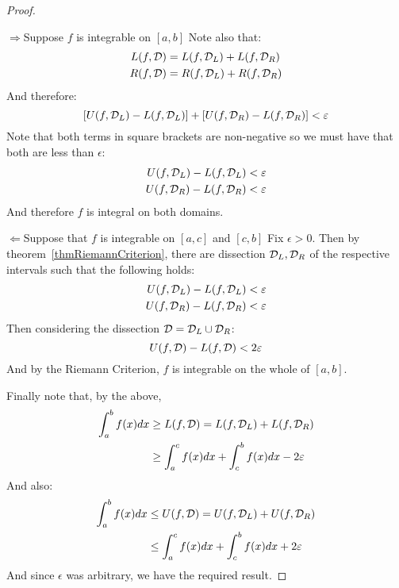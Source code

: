 \documentclass[../Main.tex]{subfiles}
\begin{document}
\begin{proof}
\begin{proofdirection}{$\Rightarrow$}{Suppose $f$ is integrable on $[a, b]$}
        Note also that:
        \begin{align*}
            L(f, \mathcal{D}) &= L(f, \mathcal{D}_L) + L(f, \mathcal{D}_R) \\
            R(f, \mathcal{D}) &= R(f, \mathcal{D}_L) + R(f, \mathcal{D}_R)
        \end{align*}
        And therefore:
        \begin{equation*}
            \left[U(f, \mathcal{D}_L) - L(f, \mathcal{D}_L)\right] + \left[U(f, \mathcal{D}_R) - L(f, \mathcal{D}_R)\right] < \varepsilon
        \end{equation*}
        Note that both terms in square brackets are non-negative so we must have that both are less than $\epsilon$:
        \begin{align*}
            U(f, \mathcal{D}_L) - L(f, \mathcal{D}_L) &< \varepsilon \\
            U(f, \mathcal{D}_R) - L(f, \mathcal{D}_R) &< \varepsilon
        \end{align*}
        And therefore $f$ is integral on both domains.
    \end{proofdirection}
    \begin{proofdirection}{$\Leftarrow$}{Suppose that $f$ is integrable on $[a, c]$ and $[c, b]$}
        Fix $\epsilon > 0$. Then by theorem~\ref{thmRiemannCriterion}, there are dissection $\mathcal{D}_L, \mathcal{D}_R$ of the respective intervals such that the following holds:
        \begin{align*}
            U(f, \mathcal{D}_L) - L(f, \mathcal{D}_L) &< \varepsilon \\
            U(f, \mathcal{D}_R) - L(f, \mathcal{D}_R) &< \varepsilon
        \end{align*}
        Then considering the dissection $\mathcal{D} = \mathcal{D}_L \cup \mathcal{D}_R$:
        \begin{equation*}
            U(f, \mathcal{D}) - L(f, \mathcal{D}) < 2\varepsilon
        \end{equation*}
        And by the Riemann Criterion, $f$ is integrable on the whole of $[a, b]$.
    \end{proofdirection}
    Finally note that, by the above,
    \begin{align*}
        \int_a^b f(x) dx &\geq L(f, \mathcal{D}) = L(f, \mathcal{D}_L) + L(f, \mathcal{D}_R) \\
        &\geq \int_a^c f(x) dx + \int_c^b f(x) dx - 2\varepsilon
    \end{align*}
    And also:
    \begin{align*}
        \int_a^b f(x) dx &\leq U(f, \mathcal{D}) = U(f, \mathcal{D}_L) + U(f, \mathcal{D}_R) \\
        &\leq \int_a^c f(x) dx + \int_c^b f(x) dx + 2\varepsilon
    \end{align*}
    And since $\epsilon$ was arbitrary, we have the required result.
\end{proof}
\end{document}
